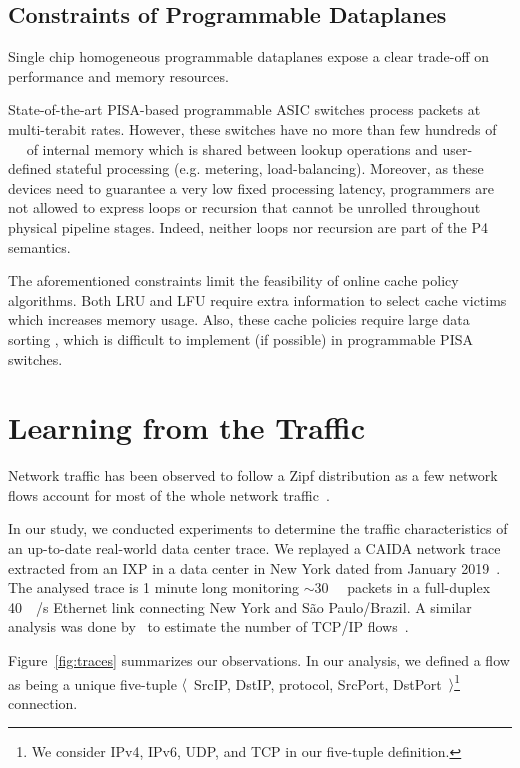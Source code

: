 \subsection{Constraints of Programmable Dataplanes}

Single chip homogeneous programmable dataplanes expose a clear trade-off on performance and memory resources.

State-of-the-art PISA-based programmable ASIC switches process packets at multi-terabit rates.
However, these switches have no more than few hundreds of \SI{}{\mega\byte} of internal memory which is shared between lookup operations and user-defined stateful processing (e.g. metering, load-balancing).
Moreover, as these devices need to guarantee a very low fixed processing latency, programmers are not allowed to express loops or recursion that cannot be unrolled throughout physical pipeline stages.
Indeed, neither loops nor recursion are part of the P4 semantics.

The aforementioned constraints limit the feasibility of online cache policy algorithms.
Both LRU and LFU require extra information to select cache victims which increases memory usage.
Also, these cache policies require large data sorting , which is difficult to implement (if possible) in programmable PISA switches.

\section{Learning from the Traffic}\label{sec:traffic}

Network traffic has been observed to follow a Zipf distribution as a few network flows account for most of the whole network traffic~\cite{Sarrar:2012,Jin:2017}.

In our study, we conducted experiments to determine the traffic characteristics of an up-to-date real-world data center trace.
We replayed a CAIDA network trace extracted from an IXP in a data center in New York dated from January 2019~\cite{caida:19}.
The analysed trace is 1 minute long monitoring $\sim$\SI{30}{\mega\nothing} packets in a full-duplex \SI{40}{\giga\bit/\second} Ethernet link connecting New York and S\~ao Paulo/Brazil.
A similar analysis was done by~\citeauthor{Spang:19} to estimate the number of TCP/IP flows~\cite{Spang:19}.

Figure~\ref{fig:traces} summarizes our observations.
In our analysis, we defined a flow as being a unique five-tuple $\langle$~SrcIP, DstIP, protocol, SrcPort, DstPort~$\rangle$\footnote{We consider IPv4, IPv6, UDP, and TCP in our five-tuple definition.} connection.


